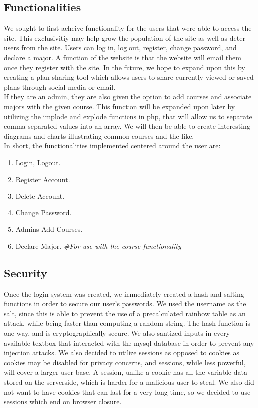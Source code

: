 \documentclass{article}
\begin{document}
\begin{doublespace}
\subsection*{Functionalities}
\indent We sought to first acheive functionality for the users that were able to access the site. This exclusivitiy may help grow the population of the site as well as deter users from the site. Users can log in, log out, register, change password, and declare a major. A function of the website is that the website will email them once they register with the site. In the future, we hope to expand upon this by creating a plan sharing tool which allows users to share currently viewed or saved plans through social media or email. \\
\indent If they are an admin, they are also given the option to add courses and associate majors with the given course. This function will be expanded upon later by utilizing the implode and explode functions in php, that will allow us to separate comma separated values into an array. We will then be able to create interesting diagrams and charts illustrating common courses and the like.\\

\indent In short, the functionalities implemented centered around the user are:
\begin{enumerate}
\item Login, Logout.
\item Register Account.
\item Delete Account.
\item Change Password.
\item Admins Add Courses.
\item Declare Major. \emph{\#For use with the course functionality}
\end{enumerate}

\subsection*{Security}
\indent Once the login system was created, we immediately created a hash and salting functions in order to secure our user's passwords. We used the username as the salt, since this is able to prevent the use of a precalculated rainbow table as an attack, while being faster than computing a random string. The hash function is one way, and is cryptographically secure. We also santized inputs in every available textbox that interacted with the mysql database in order to prevent any injection attacks. We also decided to utilize sessions as opposed to cookies as cookies may be disabled for privacy concerns, and sessions, while less powerful, will cover a larger user base. A session, unlike a cookie has all the variable data stored on the serverside, which is harder for a malicious user to steal. We also did not want to have cookies that can last for a very long time, so we decided to use sessions which end on browser closure.


\end{doublespace}
\end{document}
